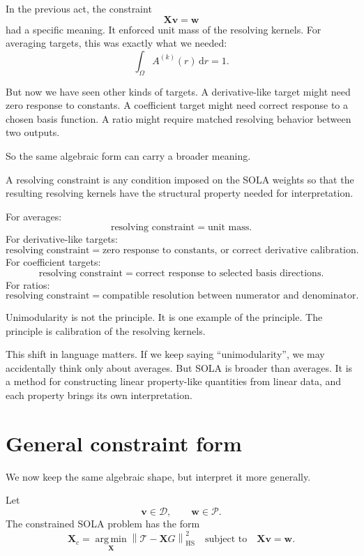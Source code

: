 \documentclass[11pt,openany]{book}
\theoremstyle{definition}
\theoremstyle{remark}
\newcommand{\D}{\mathcal D}
\newcommand{\Pspace}{\mathcal P}
\newcommand{\Tau}{\mathcal{T}}
\newcommand{\dd}{\,\mathrm d}
\newcommand{\HS}{\mathrm{HS}}
\newcommand{\argmin}{\operatorname*{arg\,min}}
\begin{document}
In the previous act, the constraint
\[
  \mathbf X\mathbf v=\mathbf w
\]
had a specific meaning. It enforced unit mass of the resolving kernels. For averaging targets,
this was exactly what we needed:
\[
  \int_\Omega A^{(k)}(r)\dd r=1.
\]

But now we have seen other kinds of targets. A derivative-like target might need zero response
to constants. A coefficient target might need correct response to a chosen basis function. A
ratio might require matched resolving behavior between two outputs.

So the same algebraic form can carry a broader meaning.

A resolving constraint is any condition imposed on the SOLA weights so that the resulting
resolving kernels have the structural property needed for interpretation.

For averages:
\[
  \text{resolving constraint}
  =
  \text{unit mass}.
\]
For derivative-like targets:
\[
  \text{resolving constraint}
  =
  \text{zero response to constants, or correct derivative calibration}.
\]
For coefficient targets:
\[
  \text{resolving constraint}
  =
  \text{correct response to selected basis directions}.
\]
For ratios:
\[
  \text{resolving constraint}
  =
  \text{compatible resolution between numerator and denominator}.
\]

\begin{lessonbox}
Unimodularity is not the principle. It is one example of the principle. The principle is
calibration of the resolving kernels.
\end{lessonbox}

This shift in language matters. If we keep saying ``unimodularity'', we may accidentally think
only about averages. But SOLA is broader than averages. It is a method for constructing linear
property-like quantities from linear data, and each property brings its own interpretation.

\section{General constraint form}

We now keep the same algebraic shape, but interpret it more generally.

Let
\[
  \mathbf v\in\D,
  \qquad
  \mathbf w\in\Pspace.
\]
The constrained SOLA problem has the form
\[
  \mathbf X_c
  =
  \argmin_{\mathbf X}
  \left\|
    \Tau-\mathbf XG
  \right\|_{\HS}^2
  \quad
  \text{subject to}
  \quad
  \mathbf X\mathbf v=\mathbf w.
\]
\end{document}
